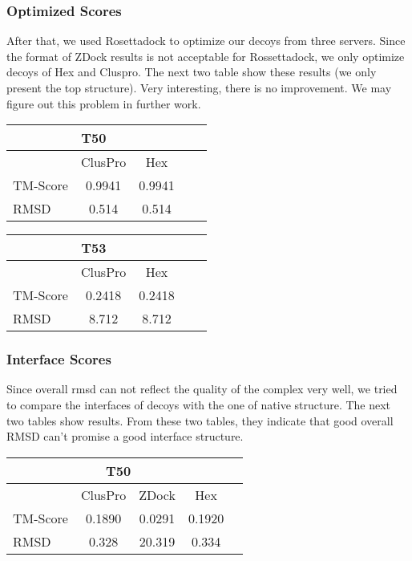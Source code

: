 \documentclass{article}
\begin{document}
\subsubsection*{Optimized Scores}

After that, we used Rosettadock to optimize our decoys from three servers. Since the format of ZDock results is not acceptable for Rossettadock, we only optimize decoys of Hex and Cluspro. The next two table show these results (we only present the top structure). Very interesting, there is no improvement. We may figure out this problem in further work.

\begin{center}
\begin{tabular}{|l|c|c|c|r|}
\multicolumn{3}{c}{T50} \\
    \hline
      & ClusPro & Hex \\ \hline
    TM-Score & 0.9941 & 0.9941 \\ \hline
    RMSD & 0.514 & 0.514 \\
    \hline
    \end{tabular}
\end{center}

\begin{center}
\begin{tabular}{|l|c|c|c|r|}
\multicolumn{3}{c}{T53} \\
    \hline
      & ClusPro & Hex \\ \hline
    TM-Score & 0.2418 & 0.2418 \\ \hline
    RMSD & 8.712 & 8.712 \\
    \hline
    \end{tabular}
\end{center}


\subsubsection*{Interface Scores}

Since overall rmsd can not reflect the quality of the complex very well, we tried to compare the interfaces of decoys with the one of native structure. The next two tables show results. From these two tables, they indicate that good overall RMSD can’t promise a good interface structure.

\begin{center}
\begin{tabular}{|l|c|c|c|r|}
\multicolumn{4}{c}{T50} \\
    \hline
      & ClusPro & ZDock & Hex \\ \hline
    TM-Score & 0.1890 & 0.0291 & 0.1920 \\ \hline
    RMSD & 0.328 & 20.319 & 0.334 \\
    \hline
    \end{tabular}
\end{center}
\end{document}
